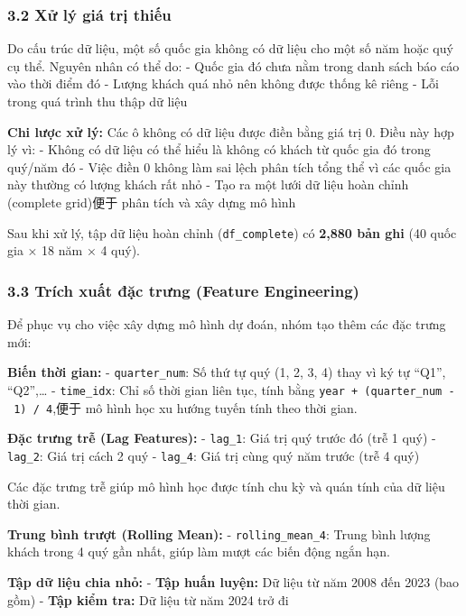 \documentclass[11pt]{article}
\begin{document}
\subsubsection{3.2 Xử lý giá trị
thiếu}\label{xux1eed-luxfd-giuxe1-trux1ecb-thiux1ebfu}

Do cấu trúc dữ liệu, một số quốc gia không có dữ liệu cho một số năm
hoặc quý cụ thể. Nguyên nhân có thể do: - Quốc gia đó chưa nằm trong
danh sách báo cáo vào thời điểm đó - Lượng khách quá nhỏ nên không được
thống kê riêng - Lỗi trong quá trình thu thập dữ liệu

\textbf{Chi lược xử lý:} Các ô không có dữ liệu được điền bằng giá trị
0. Điều này hợp lý vì: - Không có dữ liệu có thể hiểu là không có khách
từ quốc gia đó trong quý/năm đó - Việc điền 0 không làm sai lệch phân
tích tổng thể vì các quốc gia này thường có lượng khách rất nhỏ - Tạo ra
một lưới dữ liệu hoàn chỉnh (complete grid)便于 phân tích và xây dựng mô
hình

Sau khi xử lý, tập dữ liệu hoàn chỉnh (\texttt{df\_complete}) có
\textbf{2,880 bản ghi} (40 quốc gia × 18 năm × 4 quý).

\subsubsection{3.3 Trích xuất đặc trưng (Feature
Engineering)}\label{truxedch-xuux1ea5t-ux111ux1eb7c-trux1b0ng-feature-engineering}

Để phục vụ cho việc xây dựng mô hình dự đoán, nhóm tạo thêm các đặc
trưng mới:

\textbf{Biến thời gian:} - \texttt{quarter\_num}: Số thứ tự quý (1, 2,
3, 4) thay vì ký tự ``Q1'', ``Q2'',\ldots{} - \texttt{time\_idx}: Chỉ số
thời gian liên tục, tính bằng
\texttt{year\ +\ (quarter\_num\ -\ 1)\ /\ 4},便于 mô hình học xu hướng
tuyến tính theo thời gian.

\textbf{Đặc trưng trễ (Lag Features):} - \texttt{lag\_1}: Giá trị quý
trước đó (trễ 1 quý) - \texttt{lag\_2}: Giá trị cách 2 quý -
\texttt{lag\_4}: Giá trị cùng quý năm trước (trễ 4 quý)

Các đặc trưng trễ giúp mô hình học được tính chu kỳ và quán tính của dữ
liệu thời gian.

\textbf{Trung bình trượt (Rolling Mean):} - \texttt{rolling\_mean\_4}:
Trung bình lượng khách trong 4 quý gần nhất, giúp làm mượt các biến động
ngắn hạn.

\textbf{Tập dữ liệu chia nhỏ:} - \textbf{Tập huấn luyện:} Dữ liệu từ năm
2008 đến 2023 (bao gồm) - \textbf{Tập kiểm tra:} Dữ liệu từ năm 2024 trở
đi
\end{document}
